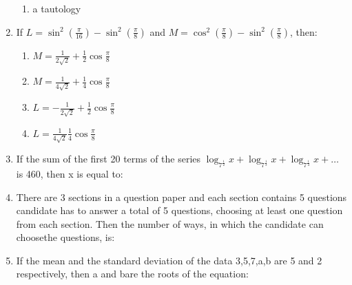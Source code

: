 \documentclass[journal,12pt,onecolumn]{IEEEtran}
\theoremstyle{remark}
\begin{document}
\begin{enumerate}
\begin{enumerate}
  \item a tautology
  \end{enumerate}
  \item If $L = \sin^2\left(\frac{\pi}{16}\right) - \sin^2\left(\frac{\pi}{8}\right)$
 and $M = \cos^2\left(\frac{\pi}{8}\right) - \sin^2\left(\frac{\pi}{8}\right)$, then:                 
 \begin{enumerate}                            
 \item $M = \frac{1}{2\sqrt{2}}+\frac{1}{2}\cos\frac{\pi}{8}$       \item $M = \frac{1}{4\sqrt{2}}+\frac{1}{4}\cos\frac{\pi}{8}$       \item $L = -\frac{1}{2\sqrt{2}}+\frac{1}{2}\cos\frac{\pi}{8}$      \item $L=\frac{1}{4\sqrt{2}}\frac{1}{4}\cos\frac{\pi}{8}$                             
 \end{enumerate}
 \item If the sum of the first 20 terms of the series $\log_{{7}^{\frac{1}{2}}} x + \log_{{7}^{\frac{1}{3}}} x + \log_{{7}^{\frac{1}{4}}} x + \dots$ is 460, then x is equal to:
 \begin{enumerate}
 \end{enumerate} 
 \item There are 3 sections in a question paper and each section contains 5 questions candidate has to answer a total of 5 questions, choosing at least one question from each section. Then the number of ways, in which the candidate can choosethe questions, is:
 \begin{enumerate}
     \end{enumerate}
     \item If the mean and the standard deviation of the data 3,5,7,a,b are 5 and 2 respectively, then a and bare the roots of the equation:
     \begin{enumerate}

\end{enumerate}
\end{enumerate}
\end{document}
